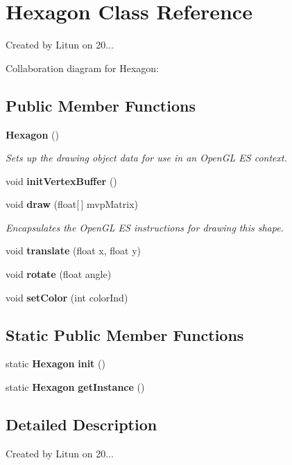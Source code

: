 \section{Hexagon Class Reference}
\label{classru_1_1litun_1_1unitingtwist_1_1_hexagon}


Created by Litun on 20...  




Collaboration diagram for Hexagon\+:
\subsection*{Public Member Functions}
\begin{DoxyCompactItemize}
\item 
\textbf{ Hexagon} ()
\begin{DoxyCompactList}\small\item\em Sets up the drawing object data for use in an Open\+GL ES context. \end{DoxyCompactList}\item 
void \textbf{ init\+Vertex\+Buffer} ()
\item 
void \textbf{ draw} (float[$\,$] mvp\+Matrix)
\begin{DoxyCompactList}\small\item\em Encapsulates the Open\+GL ES instructions for drawing this shape. \end{DoxyCompactList}\item 
void \textbf{ translate} (float x, float y)
\item 
void \textbf{ rotate} (float angle)
\item 
void \textbf{ set\+Color} (int color\+Ind)
\end{DoxyCompactItemize}
\subsection*{Static Public Member Functions}
\begin{DoxyCompactItemize}
\item 
static \textbf{ Hexagon} \textbf{ init} ()
\item 
static \textbf{ Hexagon} \textbf{ get\+Instance} ()
\end{DoxyCompactItemize}


\subsection{Detailed Description}
Created by Litun on 20... 

